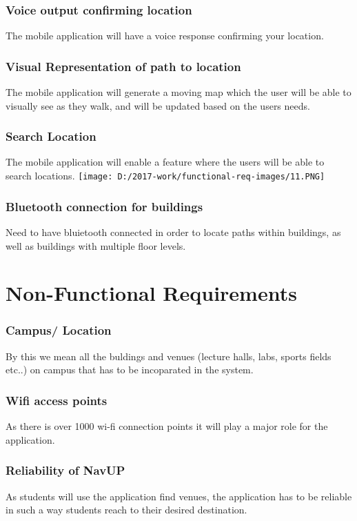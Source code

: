 \documentclass{article}
\begin{document}
\begin{center}
\subsubsection{Voice output confirming location}
The mobile application will have a voice response confirming your location.

\subsubsection{Visual Representation of path to location}
The mobile application will generate a moving map which the user will be able to visually see as they walk, and will be updated based on the users needs.
\newpage
\subsubsection{Search Location}
The mobile application will enable a feature where the users will be able to search locations.
\texttt{[image: D:/2017-work/functional-req-images/11.PNG]}

\newpage
\subsubsection{Bluetooth connection for buildings}
Need to have bluietooth connected in order to locate paths within buildings, as well as buildings with multiple floor levels.
\end{center}
\newpage
\centering
\section{Non-Functional Requirements}
 
\subsubsection{Campus/ Location}
By this we mean all the buldings and venues (lecture halls, labs, sports fields etc..) on campus that has to be incoparated in the system.
\subsubsection{Wifi access points}
As there is over 1000 wi-fi connection points it will play a major role for the application.
\subsubsection{Reliability of NavUP}
As students will use the application find venues, the application has to be reliable in such a way students reach to their desired destination.
\end{document}
